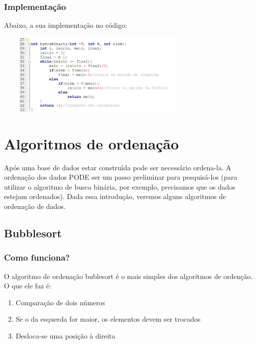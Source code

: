 \documentclass{report}
\begin{document}
	\subsubsection{Implementação}
	
	Abaixo, a sua implementação no código:
	
	\begin{center}
		
		\includegraphics[width=10cm,height=4cm,keepaspectratio=false]{imagens/bbinariafunc.png}
		
	\end{center}
	
	
	
	\section{Algoritmos de ordenação}
	Após uma base de dados estar construída pode ser necessário ordena-la. A ordenação dos dados PODE ser um passo preliminar para pesquisá-los (para utilizar o algoritmo de busca binária, por exemplo, precisamos que os dados estejam ordenados). Dada essa introdução, veremos alguns algoritmos de ordenação de dados.
	
	\subsection{Bubblesort}
	
	\subsubsection{Como funciona?}
	O algoritmo de ordenação bublesort  é o mais simples dos algoritmos de ordenção. O que ele faz é:
	
	\begin{enumerate}
		\item Comparação de dois números
		\item Se o da esquerda for maior, os elementos devem ser trocados
		\item Desloca-se uma posição à direita
	\end{enumerate}
	
\end{document}
